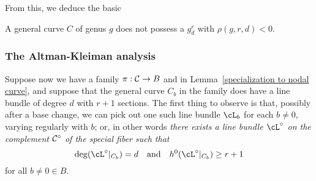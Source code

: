 From this, we deduce the basic

\begin{theorem}\label{bare-bones BN}
A general curve $C$ of genus $g$ does not possess a $g^r_d$ with $\rho(g,r,d) < 0$.
\end{theorem}

\subsubsection{The Altman-Kleiman analysis}

Suppose now we have a family $\pi : \cC \to B$ and in Lemma~\ref{specialization to nodal curve}, and suppose that the general curve $C_b$ in the family does have a line bundle  of degree $d$ with $r+1$ sections. The first thing to observe is that, possibly after a base change, we can pick out one such line bundle $\cL_b$ for each $b \neq 0$, varying regularly with $b$; or, in other words \emph{there exists a  line bundle $\cL^\circ$ on the complement $\cC^\circ$ of the special fiber such that}
$$
\deg(\cL^\circ|_{C_b}) = d \quad \text{and} \quad h^0(\cL^\circ|_{C_b}) \geq r+1
$$
for all $b \neq 0 \in B$. 



%
%
%

%
%

